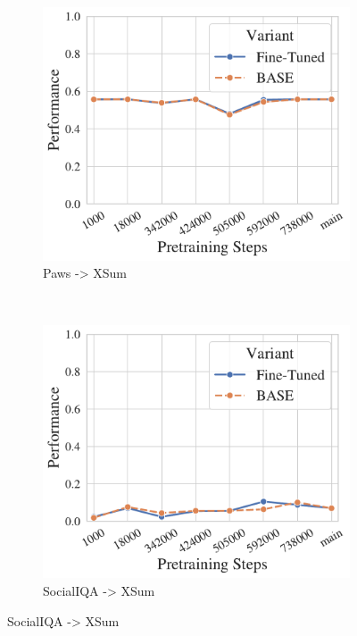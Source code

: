 \begin{figure}[t!]
    \centering
    \begin{subfigure}[b]{0.3\textwidth}
    \includegraphics[width=\the\columnwidth]{figures/fig_files/cross-task/sft_evalpaws-trainxsum.pdf}
        \caption{Paws -> XSum}
    \end{subfigure}%
    ~ 
    \begin{subfigure}[b]{0.3\textwidth}
    \includegraphics[width=\the\columnwidth]{figures/fig_files/cross-task/sft_evalsocialiqa-trainxsum.pdf}
        \caption{SocialIQA -> XSum}

\end{subfigure}
\end{figure}
